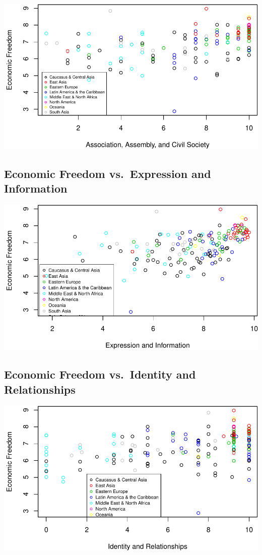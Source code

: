 \documentclass[]{article}
\begin{document}
\includegraphics{final_presentation_files/figure-latex/unnamed-chunk-7-1.pdf}

\hypertarget{economic-freedom-vs.expression-and-information}{%
\subsection{Economic Freedom vs.~Expression and
Information}\label{economic-freedom-vs.expression-and-information}}

\includegraphics{final_presentation_files/figure-latex/unnamed-chunk-8-1.pdf}

\hypertarget{economic-freedom-vs.identity-and-relationships}{%
\subsection{Economic Freedom vs.~Identity and
Relationships}\label{economic-freedom-vs.identity-and-relationships}}

\includegraphics{final_presentation_files/figure-latex/unnamed-chunk-9-1.pdf}
\end{document}
